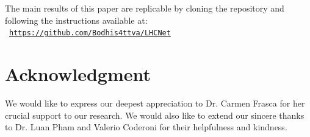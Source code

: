 \documentclass[fleqn,10pt]{SelfArx}
\begin{document}
The main results of this paper are replicable by cloning the repository and following the instructions available at:
\
\href{https://github.com/Bodhis4ttva/LHC_Net}{\texttt{https://github.com/Bodhis4ttva/LHC\textunderscore Net}}


\section{Acknowledgment}
We would like to express our deepest appreciation to Dr. Carmen Frasca for her crucial support to our research. We would also like to extend our sincere thanks to Dr. Luan Pham and Valerio Coderoni for their helpfulness and kindness.

\newpage

\

\newpage





\end{document}
